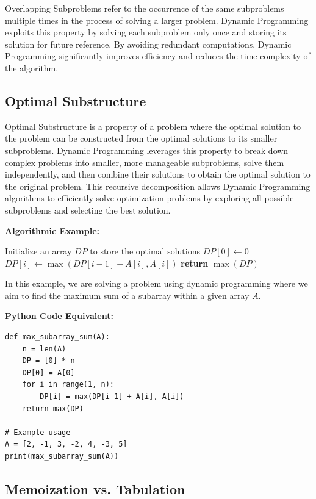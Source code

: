 \documentclass[12pt]{book} %
\begin{document}
Overlapping Subproblems refer to the occurrence of the same subproblems multiple times in the process of solving a larger problem. Dynamic Programming exploits this property by solving each subproblem only once and storing its solution for future reference. By avoiding redundant computations, Dynamic Programming significantly improves efficiency and reduces the time complexity of the algorithm.

\subsection{Optimal Substructure}

Optimal Substructure is a property of a problem where the optimal solution to the problem can be constructed from the optimal solutions to its smaller subproblems. Dynamic Programming leverages this property to break down complex problems into smaller, more manageable subproblems, solve them independently, and then combine their solutions to obtain the optimal solution to the original problem. This recursive decomposition allows Dynamic Programming algorithms to efficiently solve optimization problems by exploring all possible subproblems and selecting the best solution.

\textbf{Algorithmic Example:}
\FloatBarrier
\begin{algorithm}
\caption{Dynamic Programming Algorithm Example}
\begin{algorithmic}[1]
\State Initialize an array $DP$ to store the optimal solutions
\State $DP[0] \gets 0$
    \State $DP[i] \gets \max(DP[i-1] + A[i], A[i])$
\EndFor
\State \textbf{return} $\max(DP)$
\end{algorithmic}
\end{algorithm}
\FloatBarrier
In this example, we are solving a problem using dynamic programming where we aim to find the maximum sum of a subarray within a given array $A$.

\textbf{Python Code Equivalent:}
\FloatBarrier
\begin{lstlisting}
def max_subarray_sum(A):
    n = len(A)
    DP = [0] * n
    DP[0] = A[0]
    for i in range(1, n):
        DP[i] = max(DP[i-1] + A[i], A[i])
    return max(DP)

# Example usage
A = [2, -1, 3, -2, 4, -3, 5]
print(max_subarray_sum(A))
\end{lstlisting}

\subsection{Memoization vs. Tabulation}
\end{document}
